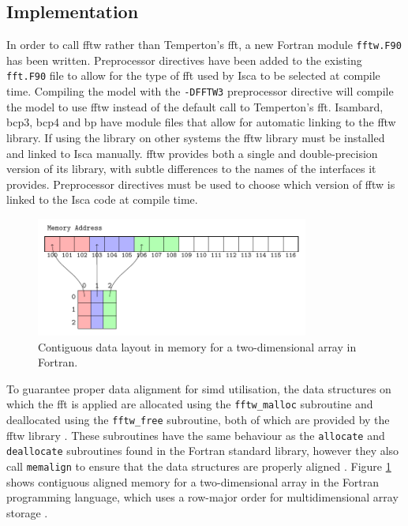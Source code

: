 \documentclass[a4paper,11pt]{report}
\begin{document}
\subsection{Implementation}
In order to call \gls{fftw} rather than Temperton's \gls{fft}, a new Fortran module \texttt{fftw.F90} has been written. Preprocessor directives have been added to the existing \texttt{fft.F90} file to allow for the type of \gls{fft} used by Isca to be selected at compile time. Compiling the model with the \texttt{-DFFTW3} preprocessor directive will compile the model to use \gls{fftw} instead of the default call to Temperton's \gls{fft}. Isambard, \gls{bcp3}, \gls{bcp4} and \gls{bp} have module files that allow for automatic linking to the \gls{fftw} library. If using the library on other systems the \gls{fftw} library must be installed and linked to Isca manually. \gls{fftw} provides both a single and double-precision version of its library, with subtle differences to the names of the interfaces it provides. Preprocessor directives must be used to choose which version of \gls{fftw} is linked to the Isca code at compile time. 
\par
\begin{figure}[htbp]
\begin{center}
\includegraphics[width=0.8\textwidth]{img/tikz-img/data_layout/data_layout.pdf}
\caption[Two-dimensional data layout in Fortran]{Contiguous data layout in memory for a two-dimensional array in Fortran.}
\label{fig:memalign}
\end{center}
\end{figure}
\par
To guarantee proper data alignment for \gls{simd} utilisation, the data structures on which the \gls{fft} is applied are allocated using the \texttt{fftw\_malloc} subroutine and deallocated using the \texttt{fftw\_free} subroutine, both of which are provided by the \gls{fftw} library \cite{frigo2005design}. These subroutines have the same behaviour as the \texttt{allocate} and \texttt{deallocate} subroutines found in the Fortran standard library, however they also call \texttt{memalign} to ensure that the data structures are properly aligned \cite{frigo2003fftw}. Figure \ref{fig:memalign} shows contiguous aligned memory for a two-dimensional array in the Fortran programming language, which uses a row-major order for multidimensional array storage \cite{lahey1994fortran}.
\end{document}

